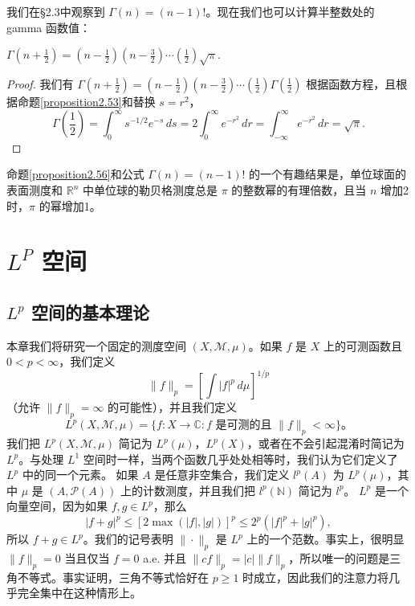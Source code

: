 \documentclass[lang=cn,10pt,thmcnt=section]{elegantbook}
\begin{document}
我们在§2.3中观察到 $\Gamma(n) = (n-1)!$。现在我们也可以计算半整数处的 gamma 函数值：

\begin{proposition}\label{proposition2.56}
$\Gamma(n + \frac{1}{2}) = (n-\frac{1}{2})(n-\frac{3}{2})\cdots(\frac{1}{2})\sqrt{\pi}$.
\end{proposition}

\begin{proof}
我们有 $\Gamma(n + \frac{1}{2}) = (n-\frac{1}{2})(n-\frac{3}{2})\cdots(\frac{1}{2})\Gamma(\frac{1}{2})$ 根据函数方程，且根据命题\ref{proposition2.53}和替换 $s = r^2$，
\[\Gamma(\frac{1}{2}) = \int_0^\infty s^{-1/2}e^{-s}\,ds = 2\int_0^\infty e^{-r^2}\,dr = \int_{-\infty}^\infty e^{-r^2}\,dr = \sqrt{\pi}.\]
\end{proof}

命题\ref{proposition2.56}和公式 $\Gamma(n) = (n-1)!$ 的一个有趣结果是，单位球面的表面测度和 $\mathbb{R}^n$ 中单位球的勒贝格测度总是 $\pi$ 的整数幂的有理倍数，且当 $n$ 增加2时，$\pi$ 的幂增加1。

\chapter{$L^P$ 空间}

\section{$L^p$ 空间的基本理论}

本章我们将研究一个固定的测度空间 $(X, \mathcal{M}, \mu)$。如果 $f$ 是 $X$ 上的可测函数且 $0 < p < \infty$，我们定义
\[ \|f\|_p = \left[ \int |f|^p \,d\mu \right]^{1/p} \]
（允许 $\|f\|_p = \infty$ 的可能性），并且我们定义
\[ L^p(X, \mathcal{M}, \mu) = \{f: X \to \mathbb{C} : f \text{ 是可测的且 } \|f\|_p < \infty\}。 \]
我们把 $L^p(X, \mathcal{M}, \mu)$ 简记为 $L^p(\mu)$，$L^p(X)$，或者在不会引起混淆时简记为 $L^p$。与处理 $L^1$ 空间时一样，当两个函数几乎处处相等时，我们认为它们定义了 $L^p$ 中的同一个元素。
如果 $A$ 是任意非空集合，我们定义 $l^p(A)$ 为 $L^p(\mu)$，其中 $\mu$ 是 $(A, \mathcal{P}(A))$ 上的计数测度，并且我们把 $l^p(\mathbb{N})$ 简记为 $l^p$。
$L^p$ 是一个向量空间，因为如果 $f, g \in L^p$，那么
\[ |f+g|^p \le [2 \max(|f|, |g|)]^p \le 2^p(|f|^p + |g|^p), \]
所以 $f+g \in L^p$。我们的记号表明 $\|\cdot\|_p$ 是 $L^p$ 上的一个范数。事实上，很明显 $\|f\|_p = 0$ 当且仅当 $f=0$ a.e. 并且 $\|cf\|_p = |c|\|f\|_p$，所以唯一的问题是三角不等式。事实证明，三角不等式恰好在 $p \ge 1$ 时成立，因此我们的注意力将几乎完全集中在这种情形上。
\end{document}
